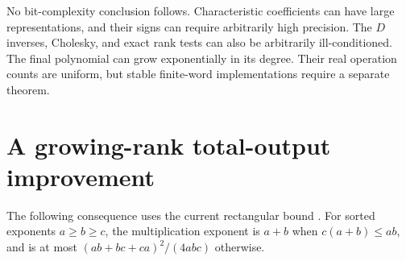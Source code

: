\documentclass[11pt]{article}
\begin{document}
No bit-complexity conclusion follows. Characteristic coefficients can have
large representations, and their signs can require arbitrarily high
precision. The \(D\) inverses, Cholesky, and exact rank tests can also be
arbitrarily ill-conditioned. The final polynomial can grow exponentially in its
degree. Their real operation counts are uniform, but stable finite-word
implementations require a separate theorem.

\section{A growing-rank total-output improvement}
The following consequence uses the current rectangular bound \cite{amanov}.
For sorted exponents \(a\geq b\geq c\), the multiplication exponent
is \(a+b\) when \(c(a+b)\leq ab\), and is at most
\((ab+bc+ca)^2/(4abc)\) otherwise.
\end{document}
